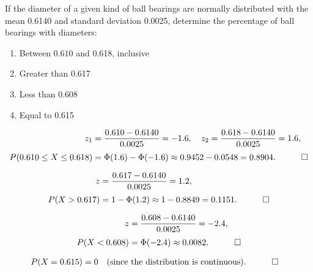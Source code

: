 \begin{hwkProblem}{4}{}

	If the diameter of a given kind of ball bearings are normally distributed with the mean \qty{0.6140}{\inch} and standard deviation \qty{0.0025}{\inch}, determine the percentage of ball bearings with diameters:
	\begin{enumerate}
		\item Between \( 0.610 \) and \qty{0.618}{\inch}, inclusive
		\item Greater than \qty{0.617}{\inch}
		\item Less than \qty{0.608}{\inch}
		\item Equal to \qty{0.615}{\inch}
	\end{enumerate}

	\hwkSol

	\hwkPart
	\begin{align*}
		z_1 &= \frac{0.610-0.6140}{0.0025}=-1.6,\quad
		z_2 = \frac{0.618-0.6140}{0.0025}=1.6,\\[1mm]
		P(0.610\le X\le 0.618)&= \Phi(1.6)-\Phi(-1.6)
		\approx 0.9452-0.0548=0.8904. \quad \qed
	\end{align*}

	\hwkPart
	\begin{align*}
		z &= \frac{0.617-0.6140}{0.0025}=1.2,\\[1mm]
		P(X>0.617)&= 1-\Phi(1.2)\approx 1-0.8849=0.1151. \quad \qed
	\end{align*}

	\hwkPart
	\begin{align*}
		z &= \frac{0.608-0.6140}{0.0025}=-2.4,\\[1mm]
		P(X<0.608)&= \Phi(-2.4)\approx 0.0082. \quad \qed
	\end{align*}

	\hwkPart
	\begin{align*}
		P(X=0.615)&= 0 \quad \text{(since the distribution is continuous)}. \quad \qed
	\end{align*}

\end{hwkProblem}

